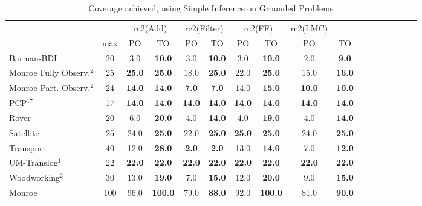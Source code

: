 \documentclass[letterpaper]{article} %
\begin{document}
\begin{table}
	\centering
	\caption{Coverage achieved, using Simple Inference on Grounded Problems}
	\label{table:GroundedSimpleCoverage}
	\scalebox{0.8} {
		\begin{tabular}{lccccccccccccccccl} 
			\toprule 
			&& \multicolumn{2}{c}{rc2(Add)} & \multicolumn{2}{c}{rc2(Filter)} & \multicolumn{2}{c}{rc2(FF)} & \multicolumn{2}{c}{rc2(LMC)} \\ 
			\cmidrule(lr){3-4} \cmidrule(lr){5-6} \cmidrule(lr){7-8} \cmidrule(lr){9-10}  
			& max &PO & TO & PO & TO & PO & TO & PO &\multicolumn{2}{c}{ TO  } \\ 
			\midrule 
			Barman-BDI & 20 & 3.0 & \textbf{10.0} & 3.0 & \textbf{10.0} & 3.0 & \textbf{10.0} & 2.0 &\multicolumn{2}{c}{ \textbf{9.0}  } \\ 
			Monroe Fully Observ.$^{2}$ & 25 & \textbf{25.0} & \textbf{25.0} & 18.0 & \textbf{25.0} & 22.0 & \textbf{25.0} & 15.0 &\multicolumn{2}{c}{ \textbf{16.0}  } \\ 
			Monroe Part. Observ.$^{2}$ & 24 & \textbf{14.0} & \textbf{14.0} & \textbf{7.0} & \textbf{7.0} & 14.0 & \textbf{15.0} & \textbf{10.0} &\multicolumn{2}{c}{ \textbf{10.0}  } \\ 
			PCP$^{17}$ & 17 & \textbf{14.0} & \textbf{14.0} & \textbf{14.0} & \textbf{14.0} & \textbf{14.0} & \textbf{14.0} & \textbf{14.0} &\multicolumn{2}{c}{ \textbf{14.0}  } \\ 
			Rover & 20 & 6.0 & \textbf{20.0} & 4.0 & \textbf{14.0} & 4.0 & \textbf{19.0} & 4.0 &\multicolumn{2}{c}{ \textbf{14.0}  } \\ 
			Satellite & 25 & 24.0 & \textbf{25.0} & 22.0 & \textbf{25.0} & \textbf{25.0} & \textbf{25.0} & 24.0 &\multicolumn{2}{c}{ \textbf{25.0}  } \\  
			Transport & 40 & 12.0 & \textbf{28.0} & \textbf{2.0} & \textbf{2.0} & 13.0 & \textbf{14.0} & 7.0 &\multicolumn{2}{c}{ \textbf{12.0}  } \\ 
			UM-Translog$^{1}$ & 22 & \textbf{22.0} & \textbf{22.0} & \textbf{22.0} & \textbf{22.0} & \textbf{22.0} & \textbf{22.0} & \textbf{22.0} &\multicolumn{2}{c}{ \textbf{22.0}  } \\ 
			Woodworking$^{2}$ & 30 & 13.0 & \textbf{19.0} & 7.0 & \textbf{15.0} & 12.0 & \textbf{20.0} & 9.0 &\multicolumn{2}{c}{ \textbf{15.0}  } \\ 
			\midrule 
			Monroe & 100 & 96.0 & \textbf{100.0} & 79.0 & \textbf{88.0} & 92.0 & \textbf{100.0} & 81.0 &\multicolumn{2}{c}{ \textbf{90.0}  } \\ 

\end{tabular}}
\end{table}
\end{document}
